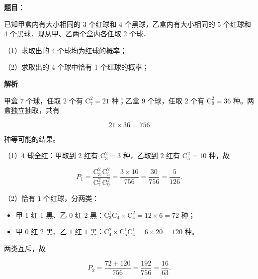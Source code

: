 \begin{answer}

\textbf{题目}：

已知甲盒内有大小相同的 3 个红球和 4 个黑球，乙盒内有大小相同的 5 个红球和 4 个黑球．现从甲、乙两个盒内各任取 2 个球．

（1）求取出的 4 个球均为红球的概率；

（2）求取出的 4 个球中恰有 1 个红球的概率；

\textbf{解析}

甲盒 $7$ 个球，任取 $2$ 个有 $\mathrm C_7^2=21$ 种；乙盒 $9$ 个球，任取 $2$ 个有 $\mathrm C_9^2=36$ 种。两盒独立抽取，共有

\nopagebreak[4]
\[21\times36=756\]

种等可能的结果。

（1）$4$ 球全红：甲取到 $2$ 红有 $\mathrm C_3^2=3$ 种，乙取到 $2$ 红有 $\mathrm C_5^2=10$ 种，故

\nopagebreak[4]
\[P_1=\frac{\mathrm C_3^2\,\mathrm C_5^2}{\mathrm C_7^2\,\mathrm C_9^2}=\frac{3\times10}{756}=\frac{30}{756}=\frac5{126}.\]

（2）恰有 $1$ 个红球，分两类：

\begin{itemize}
\item 甲 $1$ 红 $1$ 黑、乙 $0$ 红 $2$ 黑：$\mathrm C_3^1\mathrm C_4^1\times\mathrm C_4^2=12\times6=72$ 种；
\item 甲 $0$ 红 $2$ 黑、乙 $1$ 红 $1$ 黑：$\mathrm C_4^2\times\mathrm C_5^1\mathrm C_4^1=6\times20=120$ 种。
\end{itemize}

两类互斥，故

\nopagebreak[4]
\[P_2=\frac{72+120}{756}=\frac{192}{756}=\frac{16}{63}.\]


\end{answer}
